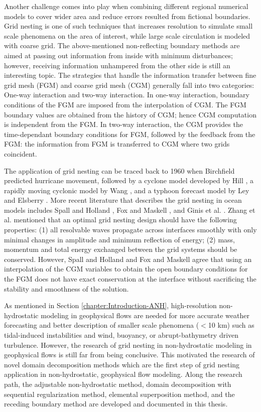 Another challenge comes into play when combining different regional numerical models to cover wider area and reduce errors resulted from fictional boundaries. Grid nesting is one of such techniques that increases resolution to simulate small scale phenomena on the area of interest, while large scale circulation is modeled with coarse grid. The above-mentioned non-reflecting boundary methods are aimed at passing out information from inside with minimum disturbances; however, receiving information unhampered from the other side is still an interesting topic. The strategies that handle the information transfer between fine grid mesh (FGM) and coarse grid mesh (CGM) generally fall into two categories: One-way interaction and two-way interaction. In one-way interaction,
boundary conditions of the FGM are imposed from the interpolation of CGM. The FGM boundary values are obtained from the history of CGM; hence CGM computation is independent from the FGM. In two-way interaction, the CGM provides the time-dependant boundary conditions for FGM, followed by the feedback from the FGM: the information from FGM is transferred to CGM where two grids coincident.

The application of grid nesting can be traced back to 1960 when Birchfield predicted hurricane movement, followed by a cyclone model developed by Hill \cite{Hill1967}, a rapidly moving cyclonic model by Wang \cite{Wang1970}, and a typhoon forecast model by Ley and Elsberry \cite{Ley1976}. More recent literature that describes the grid nesting in ocean models includes Spall and Holland \cite{Spall1991}, Fox and Maskell \cite{Fox1995}, and Ginis et al. \cite{Ginis1998}. Zhang et al. \cite{Zhang1986} mentioned that an optimal grid nesting design should have the following properties: (1) all resolvable waves propagate across interfaces smoothly with only minimal changes in amplitude and minimum reflection of energy; (2) mass, momentum and total energy exchanged between the grid systems should be conserved. However, Spall and Holland \cite{Spall1991} and Fox and Maskell \cite{Fox1995} agree that using an interpolation of the CGM variables to obtain the open boundary conditions for the FGM does not have exact conservation at the interface without sacrificing the stability and smoothness of the solution.

As mentioned in Section \ref{chapter:Introduction-ANH}, high-resolution non-hydrostatic modeling in geophysical flows are needed for more accurate weather forecasting and better description of smaller scale phenomena ($<$10 km) \cite{Marshall1997} such as tidal-induced instabilities and wind, buoyancy, or abrupt-bathymetry driven turbulence. However, the research of grid nesting in non-hydrostatic modeling in geophysical flows is still far from being conclusive. This motivated the research of novel domain decomposition methods which are the first step of grid nesting application in non-hydrostatic, geophysical flow modeling. Along the research path, the adjustable non-hydrostatic method, domain decomposition with sequential regularization method, elemental superposition method, and the receding boundary method are developed and documented in this thesis.  